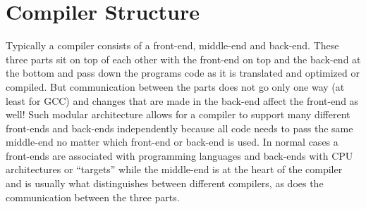 \chapter{Compiler Structure}
\label{chapter:compiler structure}
\newlength\Colsep
\setlength\Colsep{10pt}
Typically a compiler consists of a front-end, middle-end and back-end. These three parts sit on top of each other with the front-end on top and the back-end at the bottom and pass down the programs code as it is translated and optimized or compiled. But communication between the parts does not go only one way (at least for GCC)
and changes that are made in the back-end affect the front-end as well!
Such modular architecture  allows for a compiler to support many different front-ends and back-ends independently because all code needs to pass the same middle-end no matter which front-end or back-end is used. In normal cases a front-ends are associated with programming languages and back-ends with CPU architectures or ``targets'' while the middle-end is at the heart of the compiler and is usually what distinguishes between different compilers, as does the communication between the three parts.
\smallskip
